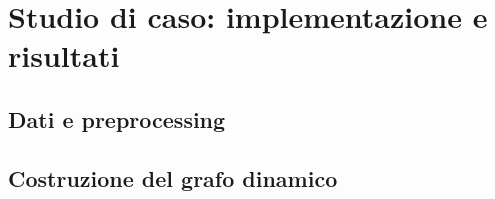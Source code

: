 %
%
%
%
\chapter{Studio di caso: implementazione e risultati}
\label{ch:case-study}

\section{Dati e preprocessing}
\label{sec:data-preprocessing}

\section{Costruzione del grafo dinamico}
\label{sec:dynamic-graph-construction}

